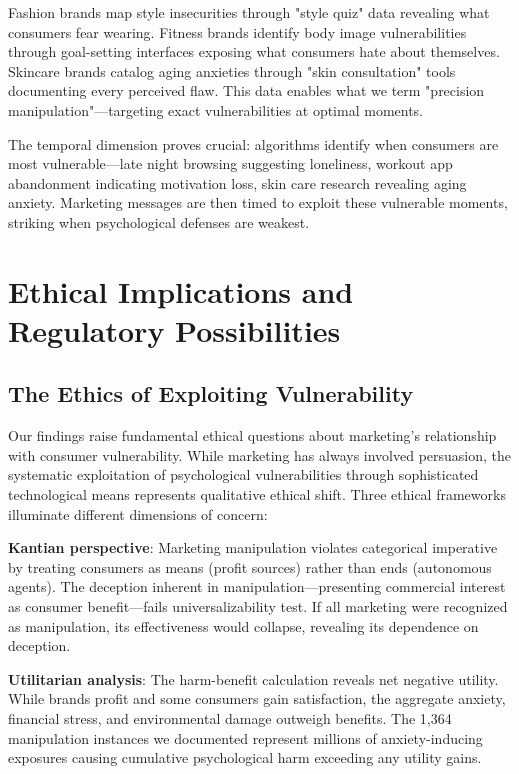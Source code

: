 Fashion brands map style insecurities through "style quiz" data revealing what consumers fear wearing. Fitness brands identify body image vulnerabilities through goal-setting interfaces exposing what consumers hate about themselves. Skincare brands catalog aging anxieties through "skin consultation" tools documenting every perceived flaw. This data enables what we term "precision manipulation"—targeting exact vulnerabilities at optimal moments.

The temporal dimension proves crucial: algorithms identify when consumers are most vulnerable—late night browsing suggesting loneliness, workout app abandonment indicating motivation loss, skin care research revealing aging anxiety. Marketing messages are then timed to exploit these vulnerable moments, striking when psychological defenses are weakest.

\section{Ethical Implications and Regulatory Possibilities}
\label{sec:ethics_regulation}

\subsection{The Ethics of Exploiting Vulnerability}

Our findings raise fundamental ethical questions about marketing's relationship with consumer vulnerability. While marketing has always involved persuasion, the systematic exploitation of psychological vulnerabilities through sophisticated technological means represents qualitative ethical shift. Three ethical frameworks illuminate different dimensions of concern:

\textbf{Kantian perspective}: Marketing manipulation violates categorical imperative by treating consumers as means (profit sources) rather than ends (autonomous agents). The deception inherent in manipulation—presenting commercial interest as consumer benefit—fails universalizability test. If all marketing were recognized as manipulation, its effectiveness would collapse, revealing its dependence on deception.

\textbf{Utilitarian analysis}: The harm-benefit calculation reveals net negative utility. While brands profit and some consumers gain satisfaction, the aggregate anxiety, financial stress, and environmental damage outweigh benefits. The 1,364 manipulation instances we documented represent millions of anxiety-inducing exposures causing cumulative psychological harm exceeding any utility gains.

